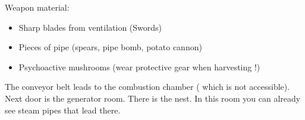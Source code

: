 Weapon material:

\begin{itemize}
\item Sharp blades from ventilation (Swords)
\item Pieces of pipe (spears, pipe bomb, potato cannon)
\item Psychoactive mushrooms (wear protective gear when harvesting !)
\end{itemize}


The conveyor belt leads to the combustion chamber ( which is not accessible). Next door is the generator room. There is the nest.
In this room you can already see steam pipes that lead there.

\begin{npcBox}[title=Lucien\, Director]

    \begin{aspects}
    \item {}
    \item {}
    \end{aspects}

    \begin{skills}
    \item {}
    \item {}
    \item {}
    \item {}
    \item {}
    \item {}
    \item {}
    \item {}
    \item {}
    \item {}
    \item {}
    \item {}
    \item {}
    \item {}
    \item {}
    \item {}
    \item {}
    \item {}
    \item {}
    \end{skills}


\end{npcBox}
